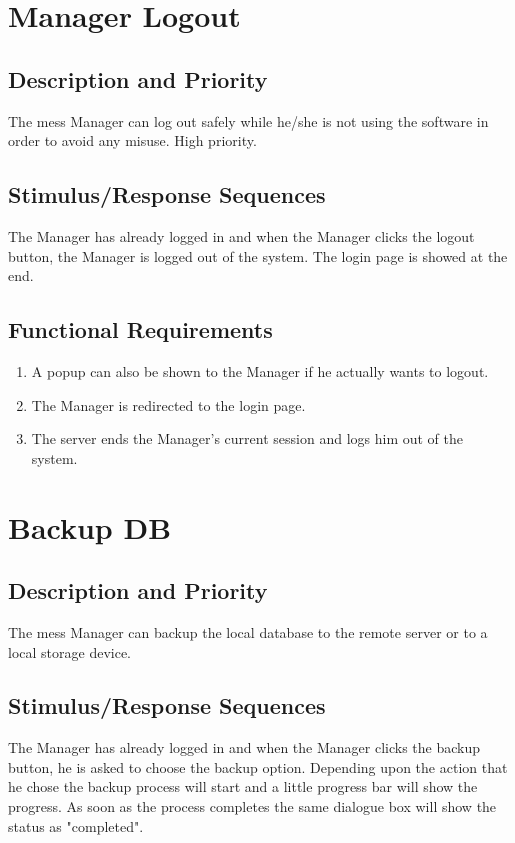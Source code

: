 \documentclass{scrreprt}
\begin{document}
\section{Manager Logout}

\subsection{Description and Priority}
The mess Manager can log out safely while he/she is not using the software in order to avoid any misuse. High priority.

\subsection{Stimulus/Response Sequences}
The Manager has already logged in and when the Manager clicks the logout button, the Manager is logged out of the system. The login page is showed at the end.

\subsection{Functional Requirements}
\begin{enumerate}
\item A popup can also be shown to the Manager if he actually wants to logout.
\item The Manager is redirected to the login page. 
\item The server ends the Manager's current session and logs him out of the system. 
\end{enumerate}

\section{Backup DB}

\subsection{Description and Priority}
The mess Manager can backup the local database to the remote server or to a local storage device.

\subsection{Stimulus/Response Sequences}
The Manager has already logged in and when the Manager clicks the backup button, he is asked to choose the backup option. Depending upon the action that he chose the backup process will start and a little progress bar will show the progress. As soon as the process completes the same dialogue box will show the status as "completed".
\end{document}
